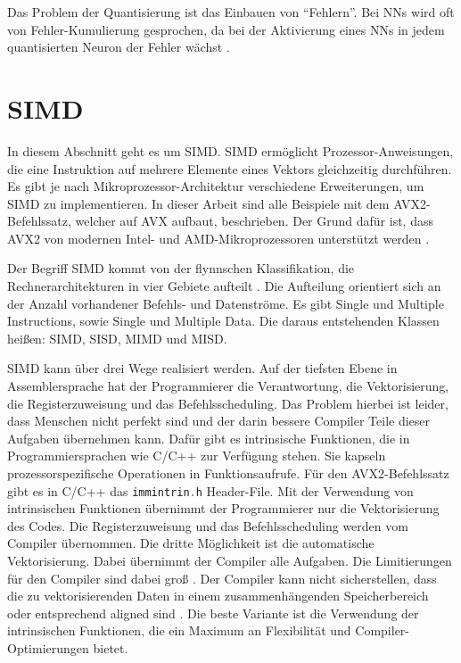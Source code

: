 Das Problem der Quantisierung ist das Einbauen von \enquote{Fehlern}. Bei \acp{NN} wird oft von Fehler-Kumulierung gesprochen, da bei der Aktivierung eines \acp{NN} in jedem quantisierten Neuron der Fehler wächst \cite{Park2018}.

\section{SIMD}

In diesem Abschnitt geht es um \ac{SIMD}. \ac{SIMD} ermöglicht Prozessor-Anweisungen, die eine Instruktion auf mehrere Elemente eines Vektors gleichzeitig durchführen. Es gibt je nach Mikroprozessor-Architektur verschiedene Erweiterungen, um \ac{SIMD} zu implementieren. In dieser Arbeit sind alle Beispiele mit dem \ac{AVX2}-Befehlssatz, welcher auf \ac{AVX} aufbaut, beschrieben. Der Grund dafür ist, dass \ac{AVX2} von modernen Intel- und AMD-Mikroprozessoren unterstützt werden \cite[S. 117]{fog2006optimizing}.

Der Begriff \ac{SIMD} kommt von der flynnschen Klassifikation, die Rechnerarchitekturen in vier Gebiete aufteilt \cite{Flynn1972}. Die Aufteilung orientiert sich an der Anzahl vorhandener Befehls- und Datenströme. Es gibt Single und Multiple Instructions, sowie Single und Multiple Data. Die daraus entstehenden Klassen heißen: \ac{SIMD}, \ac{SISD}, \ac{MIMD} und \ac{MISD}.

\ac{SIMD} kann über drei Wege realisiert werden. Auf der tiefsten Ebene in Assemblersprache hat der Programmierer die Verantwortung, die Vektorisierung, die Registerzuweisung und das Befehlsscheduling. Das Problem hierbei ist leider, dass Menschen nicht perfekt sind und der darin bessere Compiler Teile dieser Aufgaben übernehmen kann. Dafür gibt es intrinsische Funktionen, die in Programmiersprachen wie C/C++ zur Verfügung stehen. Sie kapseln prozessorspezifische Operationen in Funktionsaufrufe. Für den \ac{AVX2}-Befehlssatz gibt es in C/C++ das \lstinline[language=C++]{immintrin.h} Header-File. Mit der Verwendung von intrinsischen Funktionen übernimmt der Programmierer nur die Vektorisierung des Codes. Die Registerzuweisung und das Befehlsscheduling werden vom Compiler übernommen. Die dritte Möglichkeit ist die automatische Vektorisierung. Dabei übernimmt der Compiler alle Aufgaben. Die Limitierungen für den Compiler sind dabei groß \cite{ren2003preliminary}. Der Compiler kann nicht sicherstellen, dass die zu vektorisierenden Daten in einem zusammenhängenden Speicherbereich oder entsprechend aligned sind \cite[S. 118-120]{fog2006optimizing}. Die beste Variante ist die Verwendung der intrinsischen Funktionen, die ein Maximum an Flexibilität und Compiler-Optimierungen bietet.

